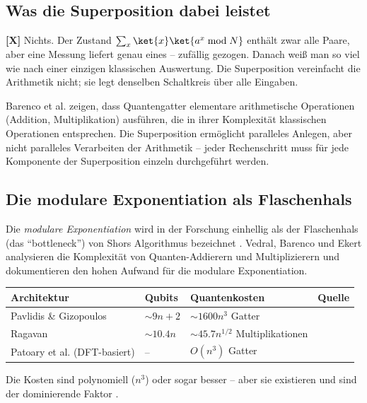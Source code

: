 \subsection{Was die Superposition dabei leistet}

\textbf{[X]} Nichts. Der Zustand
$\sum_x \ket{x}\ket{a^x \bmod N}$ enthält zwar alle Paare, aber eine
Messung liefert genau eines -- zufällig gezogen. Danach weiß man so
viel wie nach einer einzigen klassischen Auswertung. Die Superposition
vereinfacht die Arithmetik nicht; sie legt denselben Schaltkreis über
alle Eingaben.

Barenco et al. \cite{Barenco1995} zeigen, dass Quantengatter elementare
arithmetische Operationen (Addition, Multiplikation) ausführen, die in
ihrer Komplexität klassischen Operationen entsprechen. Die Superposition
ermöglicht paralleles Anlegen, aber nicht paralleles Verarbeiten der
Arithmetik -- jeder Rechenschritt muss für jede Komponente der
Superposition einzeln durchgeführt werden.

\subsection{Die modulare Exponentiation als Flaschenhals}

Die \emph{modulare Exponentiation} wird in der Forschung einhellig als der
Flaschenhals (das ``bottleneck'') von Shors Algorithmus bezeichnet
\cite{Vedral1996}. Vedral, Barenco und Ekert analysieren die Komplexität
von Quanten-Addierern und Multiplizierern und dokumentieren den hohen
Aufwand für die modulare Exponentiation.

\begin{center}
\begin{tabular}{llll}
\toprule
Architektur & Qubits & Quantenkosten & Quelle \\
\midrule
Pavlidis \& Gizopoulos & $\sim 9n + 2$ & $\sim 1600 n^3$ Gatter & \cite{Pavlidis2014} \\
Ragavan & $\sim 10.4n$ & $\sim 45.7 n^{1/2}$ Multiplikationen & \cite{Ragavan2018} \\
Patoary et al. (DFT-basiert) & -- & $O(n^3)$ Gatter & \cite{Patoary2021} \\
\bottomrule
\end{tabular}
\end{center}

Die Kosten sind polynomiell ($n^3$) oder sogar besser -- aber sie
existieren und sind der dominierende Faktor \cite{Nielsen2010}.

